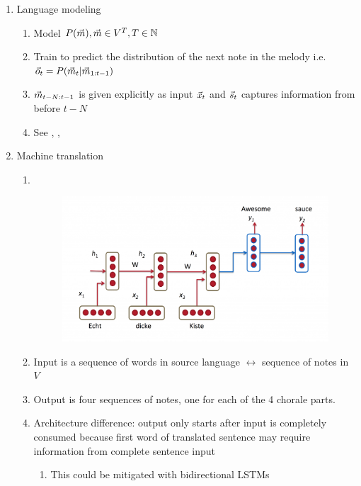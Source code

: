 \begin{enumerate}
    \item Language modeling
        \begin{enumerate}
            \item Model $P(\vec{m}), \vec{m} \in V^T, T \in \mathbb{N}$
            \item Train to predict the distribution of the next note in the
                melody i.e.\ $\vec{o}_t = P(\vec{m}_t | \vec{m}_{1:t-1})$
            \item $\vec{m}_{t-N:t-1}$ is given explicitly as input $\vec{x}_t$ and
                $\vec{s}_{t}$ captures information from before $t-N$
            \item See \cite{Martens2011}, \cite{Mikolov2011}, \cite{Mikolov2010}
        \end{enumerate}
    \item Machine translation
        \begin{enumerate}
            \item~\\
                \begin{figure}[htpb]
                    \centering
                    \includegraphics[width=0.8\linewidth]{Figures/rnn-mt.png}
                    \caption{}
                \end{figure}
            \item Input is a sequence of words in source language $\leftrightarrow$
                sequence of notes in $V$
            \item Output is four sequences of notes, one for each of the 4 chorale parts.
            \item Architecture difference: output only starts after input is completely
                consumed because first word of translated sentence may require information
                from complete sentence input
                \begin{enumerate}
                    \item This could be mitigated with bidirectional LSTMs \cite{Graves2005}

\end{enumerate}
\end{enumerate}
\end{enumerate}
